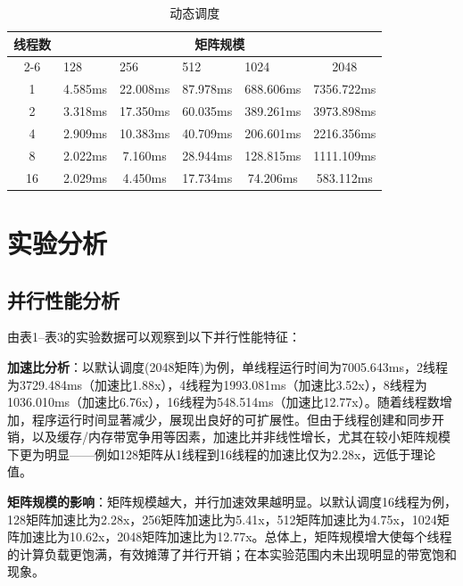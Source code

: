 \documentclass{SYSUReport}
\begin{document}
\begin{table}[H]
\centering
\caption{动态调度}
\label{表3}
\begin{tabular}{|c|c|c|c|c|c|}
\hline
\multirow{2}{*}{线程数} & \multicolumn{5}{c|}{矩阵规模}                                                                        \\ \cline{2-6} 
 & \multicolumn{1}{l|}{128} & \multicolumn{1}{l|}{256} & \multicolumn{1}{l|}{512} & \multicolumn{1}{l|}{1024} & 2048 \\ \hline
1                    & 4.585ms & 22.008ms & 87.978ms & 688.606ms & 7356.722ms \\ \hline
2                    & 3.318ms & 17.350ms & 60.035ms & 389.261ms & 3973.898ms \\ \hline
4                    & 2.909ms & 10.383ms & 40.709ms & 206.601ms & 2216.356ms \\ \hline
8                    & 2.022ms & 7.160ms & 28.944ms & 128.815ms & 1111.109ms \\ \hline
16                   & 2.029ms & 4.450ms & 17.734ms & 74.206ms & 583.112ms \\ \hline
\end{tabular}
\end{table}
\section{实验分析}

\subsection{并行性能分析}

由表1--表3的实验数据可以观察到以下并行性能特征：

\textbf{加速比分析}：以默认调度(2048矩阵)为例，单线程运行时间为7005.643ms，2线程为3729.484ms（加速比1.88x），4线程为1993.081ms（加速比3.52x），8线程为1036.010ms（加速比6.76x），16线程为548.514ms（加速比12.77x）。随着线程数增加，程序运行时间显著减少，展现出良好的可扩展性。但由于线程创建和同步开销，以及缓存/内存带宽争用等因素，加速比并非线性增长，尤其在较小矩阵规模下更为明显——例如128矩阵从1线程到16线程的加速比仅为2.28x，远低于理论值。

\textbf{矩阵规模的影响}：矩阵规模越大，并行加速效果越明显。以默认调度16线程为例，128矩阵加速比为2.28x，256矩阵加速比为5.41x，512矩阵加速比为4.75x，1024矩阵加速比为10.62x，2048矩阵加速比为12.77x。总体上，矩阵规模增大使每个线程的计算负载更饱满，有效摊薄了并行开销；在本实验范围内未出现明显的带宽饱和现象。
\end{document}
